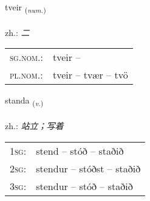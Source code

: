 \documentclass[frontgrid, backgrid]{flacards}\usepackage[]{graphicx}\usepackage[]{xcolor}
\begin{document}
\renewcommand{\flhead}{\vskip5pt \fboxsep=0pt {\small\bfseries\footnotesize Töluorð | 数量词}}
\renewcommand{\fcfoot}{\vskip5pt \fboxsep=0pt \hspace{2pt}{\small\bfseries\footnotesize 1K}}

\renewcommand{\blhead}{\vskip5pt {\small\bfseries\footnotesize Töluorð | 数量词 }}
\renewcommand{\bcfoot}{\vskip5pt \hspace{2pt}{\small\bfseries\footnotesize 1K}}


{tveir \small{\textsubscript{(\textit{num.})}} \\[1ex] %
\textphonetic{[tʰveiːr]} \\
zh.: \emph{二} \\  [2ex]
\renewcommand*{\arraystretch}{0.8}
\begin{tabular}{ll}
\textsc{sg.nom.}: & tveir  -- \\ 
\textsc{pl.nom.}: & tveir -- tvær -- tvö
\end{tabular}
}

\renewcommand{\flhead}{\vskip5pt \fboxsep=0pt {\small\bfseries\footnotesize Sagnorð | 动词}}
\renewcommand{\fcfoot}{\vskip5pt \fboxsep=0pt \hspace{2pt}{\small\bfseries\footnotesize 1K}}

\renewcommand{\blhead}{\vskip5pt {\small\bfseries\footnotesize Sagnorð | 动词 }}
\renewcommand{\bcfoot}{\vskip5pt \hspace{2pt}{\small\bfseries\footnotesize 1K}}


{standa \small{\textsubscript{(\textit{v.})}} \\[1ex] %
\textphonetic{[stanta]} \\
zh.: \emph{站立；写着} \\  [2ex]
\renewcommand*{\arraystretch}{0.8}
\begin{tabular}{p{1cm}l}
\textsc{1sg}: & stend -- stóð -- staðið \\ 
\textsc{2sg}: & stendur -- stóðst -- staðið \\ 
\textsc{3sg}: & stendur -- stóð -- staðið \\ 
\end{tabular}
}
\end{document}

